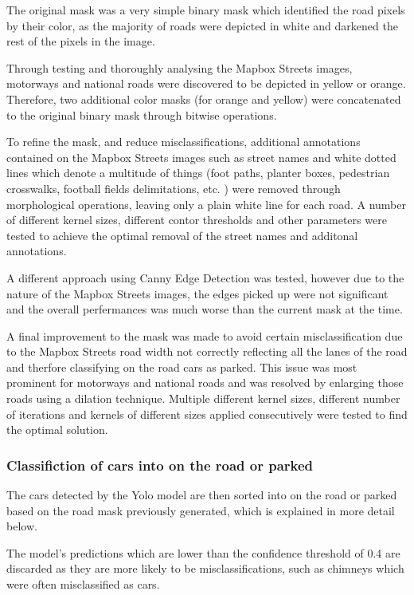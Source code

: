 The original mask was a very simple binary mask which identified the road pixels by their color, as the majority of roads were depicted in white and darkened the rest of the pixels in the image.

Through testing and thoroughly analysing the Mapbox Streets images, motorways and national roads were discovered to be depicted in yellow or orange. Therefore, two additional color masks (for orange and yellow) were concatenated to the original binary mask through bitwise operations.

To refine the mask, and reduce misclassifications, additional annotations contained on the Mapbox Streets images such as street names and white dotted lines which denote a multitude of things (foot paths, planter boxes, pedestrian crosswalks, football fields delimitations, etc. ) were removed through morphological operations, leaving only a plain white line for each road.
A number of different kernel sizes, different contor thresholds and other parameters were tested to achieve the optimal removal of the street names and additonal annotations.

A different approach using Canny Edge Detection was tested, however due to the nature of the Mapbox Streets images, the edges picked up were not significant and the overall perfermances was much worse than the current mask at the time.

A final improvement to the mask was made to avoid certain misclassification due to the Mapbox Streets road width not correctly reflecting all the lanes of the road and therfore classifying on the road cars as parked. This issue was most prominent for motorways and national roads and was resolved by enlarging those roads using a dilation technique. Multiple different kernel sizes, different number of iterations and kernels of different sizes applied consecutively were tested to find the optimal solution.


\subsubsection{Classifiction of cars into on the road or parked}
The cars detected by the Yolo model are then sorted into on the road or parked based on the road mask previously generated, which is explained in more detail below.

The model's predictions which are lower than the confidence threshold of 0.4 are discarded as they are more likely to be misclassifications, such as chimneys which were often misclassified as cars.

